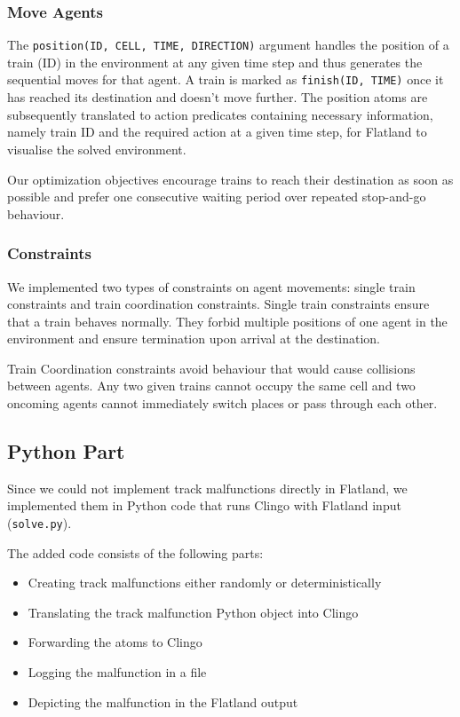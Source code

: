 \documentclass[runningheads]{llncs}
\begin{document}
\subsubsection{Move Agents}\label{move_agents}
The \verb|position(ID, CELL, TIME, DIRECTION)| argument handles the position of a train (ID) in the environment at any given time step and thus generates the sequential moves for that agent. A train is marked as \verb|finish(ID, TIME)| once it has reached its destination and doesn't move further. The position atoms are subsequently translated to action predicates containing necessary information, namely train ID and the required action at a given time step, for Flatland to visualise the solved environment.

Our optimization objectives encourage trains to reach their destination as soon as possible and prefer one consecutive waiting period over repeated stop-and-go behaviour.

\subsubsection{Constraints}
We implemented two types of constraints on agent movements: single train constraints and train coordination constraints. Single train constraints ensure that a train behaves normally. They forbid multiple positions of one agent in the environment and ensure termination upon arrival at the destination.

Train Coordination constraints avoid behaviour that would cause collisions between agents. Any two given trains cannot occupy the same cell and two oncoming agents cannot immediately switch places or pass through each other.



\subsection{Python Part}\label{solve}

Since we could not implement track malfunctions directly in Flatland, we implemented them in Python code that runs Clingo with Flatland input (\verb|solve.py|).

The added code consists of the following parts:

\begin{itemize}
    \item Creating track malfunctions either randomly or deterministically
    \item Translating the track malfunction Python object into Clingo
    \item Forwarding the atoms to Clingo
    \item Logging the malfunction in a file
    \item Depicting the malfunction in the Flatland output
\end{itemize}
\end{document}
